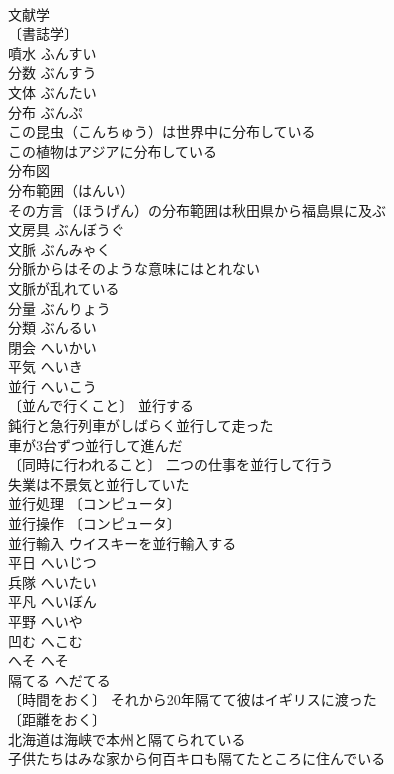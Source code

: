 \documentclass[8pt]{extreport}
\begin{document}
\begin{CJK}{UTF8}{min}
\\	文献学 
\\	〔書誌学〕
\\	噴水	ふんすい	
\\	分数	ぶんすう	
\\	文体	ぶんたい	
\\	分布	ぶんぷ	
\\	この昆虫（こんちゅう）は世界中に分布している 
\\	この植物はアジアに分布している 
\\	分布図 
\\	分布範囲（はんい） 
\\	その方言（ほうげん）の分布範囲は秋田県から福島県に及ぶ 
\\	文房具	ぶんぼうぐ	
\\	文脈	ぶんみゃく	
\\	分脈からはそのような意味にはとれない 
\\	文脈が乱れている 
\\	分量	ぶんりょう	
\\	分類	ぶんるい	
\\	閉会	へいかい	
\\	平気	へいき	
\\	並行	へいこう	
\\	〔並んで行くこと〕 並行する 
\\	鈍行と急行列車がしばらく並行して走った 
\\	車が3台ずつ並行して進んだ 
\\	〔同時に行われること〕 二つの仕事を並行して行う 
\\	失業は不景気と並行していた 
\\	並行処理 〔コンピュータ〕
\\	並行操作 〔コンピュータ〕
\\	並行輸入 ウイスキーを並行輸入する 
\\	平日	へいじつ	
\\	兵隊	へいたい	
\\	平凡	へいぼん	
\\	平野	へいや	
\\	凹む	へこむ	
\\	へそ	へそ	
\\	隔てる	へだてる	
\\	〔時間をおく〕 それから20年隔てて彼はイギリスに渡った 
\\	〔距離をおく〕
\\	北海道は海峡で本州と隔てられている 
\\	子供たちはみな家から何百キロも隔てたところに住んでいる 

\end{CJK}
\end{document}
